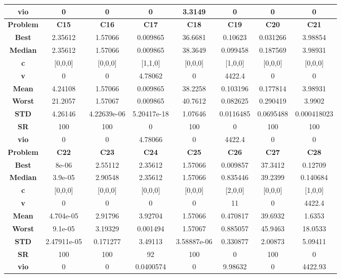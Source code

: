 \documentclass{IEEEtran}
\begin{document}
\begin{center}
\begin{tabular}{|c|c|c|c|c|c|c|c|}
    \textbf{vio} & 0 & 0 & 0 & 3.3149 & 0 & 0 & 0\\ 
    \hline 
    \hline 
    \textbf{Problem} & \textbf{C15} & \textbf{C16} & \textbf{C17} & \textbf{C18} & \textbf{C19} & \textbf{C20} & \textbf{C21} \\ 
    \hline\hline 
    \textbf{Best} & 2.35612 & 1.57066 & 0.009865 & 36.6681 & 0.10623 & 0.031266 & 3.98854\\ 
    \textbf{Median} & 2.35612 & 1.57066 & 0.009865 & 38.3649 & 0.099458 & 0.187569 & 3.98931\\ 
    \textbf{c} & [0,0,0] & [0,0,0] & [1,1,0] & [0,0,0] & [1,0,0] & [0,0,0] & [0,0,0]\\ 
    \textbf{v} & 0 & 0 & 4.78062 & 0 & 4422.4 & 0 & 0\\ 
    \textbf{Mean} & 4.24108 & 1.57066 & 0.009865 & 38.2258 & 0.103196 & 0.177814 & 3.98931\\ 
    \textbf{Worst} & 21.2057 & 1.57067 & 0.009865 & 40.7612 & 0.082625 & 0.290419 & 3.9902\\ 
    \textbf{STD} & 4.26146 & 4.22639e-06 & 5.20417e-18 & 1.07646 & 0.0116485 & 0.0695488 & 0.000418023\\ 
    \textbf{SR} & 100 & 100 & 0 & 100 & 0 & 100 & 100\\ 
    \textbf{vio} & 0 & 0 & 4.78066 & 0 & 4422.4 & 0 & 0\\ 
    \hline 
    \hline 
    \textbf{Problem} & \textbf{C22} & \textbf{C23} & \textbf{C24} & \textbf{C25} & \textbf{C26} & \textbf{C27} & \textbf{C28} \\ 
    \hline\hline 
    \textbf{Best} & 8e-06 & 2.55112 & 2.35612 & 1.57066 & 0.009857 & 37.3412 & 0.12709\\ 
    \textbf{Median} & 3.9e-05 & 2.90548 & 2.35612 & 1.57066 & 0.835446 & 39.2399 & 0.140684\\ 
    \textbf{c} & [0,0,0] & [0,0,0] & [0,0,0] & [0,0,0] & [2,0,0] & [0,0,0] & [1,0,0]\\ 
    \textbf{v} & 0 & 0 & 0 & 0 & 11 & 0 & 4422.4\\ 
    \textbf{Mean} & 4.704e-05 & 2.91796 & 3.92704 & 1.57066 & 0.470817 & 39.6932 & 1.6353\\ 
    \textbf{Worst} & 9.1e-05 & 3.19329 & 0.001494 & 1.57067 & 0.885057 & 45.9463 & 18.0533\\ 
    \textbf{STD} & 2.47911e-05 & 0.171277 & 3.49113 & 3.58887e-06 & 0.330877 & 2.00873 & 5.09411\\ 
    \textbf{SR} & 100 & 100 & 92 & 100 & 0 & 100 & 0\\ 
    \textbf{vio} & 0 & 0 & 0.0400574 & 0 & 9.98632 & 0 & 4422.93\\ 
    \hline 
  \end{tabular}
\end{center}
\newpage
\end{document}

